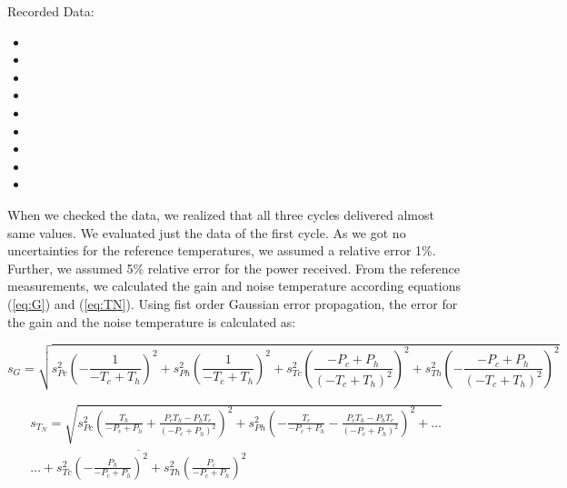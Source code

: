 Recorded Data:
\begin{itemize}
    \item {}
    \item {}
    \item {}
    \item {}
    \item {}
    \item {}
    \item {}
    \item {}
    \item {}
\end{itemize}
When we checked the data, we realized that all three cycles delivered almost same values. We evaluated just the data of the first cycle. As we got no uncertainties for the reference temperatures, we assumed a relative error 1\%. Further, we assumed 5\% relative error for the power received. From the reference measurements, we calculated the gain and noise temperature according equations (\ref{eq:G}) and (\ref{eq:TN}). Using fist order Gaussian error propagation, the error for the gain and the noise temperature is calculated as:

\begin{equation}
	s_{G} = \sqrt{s_{P c}^{2} \left(- \frac{1}{- T_{c} + T_{h}}\right)^{2} + s_{P h}^{2} \left(\frac{1}{- T_{c} + T_{h}}\right)^{2} + s_{T c}^{2} \left(\frac{- P_{c} + P_{h}}{\left(- T_{c} + T_{h}\right)^{2}}\right)^{2} + s_{T h}^{2} \left(- \frac{- P_{c} + P_{h}}{\left(- T_{c} + T_{h}\right)^{2}}\right)^{2}}
\end{equation}

\begin{equation}
	\begin{split}
	s_{T_N} = \sqrt{s_{P c}^{2} \left(\frac{T_{h}}{- P_{c} + P_{h}} + \frac{P_{c} T_{h} - P_{h} T_{c}}{\left(- P_{c} + P_{h}\right)^{2}}\right)^{2} + s_{P h}^{2} \left(- \frac{T_{c}}{- P_{c} + P_{h}} - \frac{P_{c} T_{h} - P_{h} T_{c}}{\left(- P_{c} + P_{h}\right)^{2}}\right)^{2} + \hdots } \\
	\overline{\hdots + s_{T c}^{2} \left(- \frac{P_{h}}{- P_{c} + P_{h}}\right)^{2} + s_{T h}^{2} \left(\frac{P_{c}}{- P_{c} + P_{h}}\right)^{2}}
	\end{split}
\end{equation}

